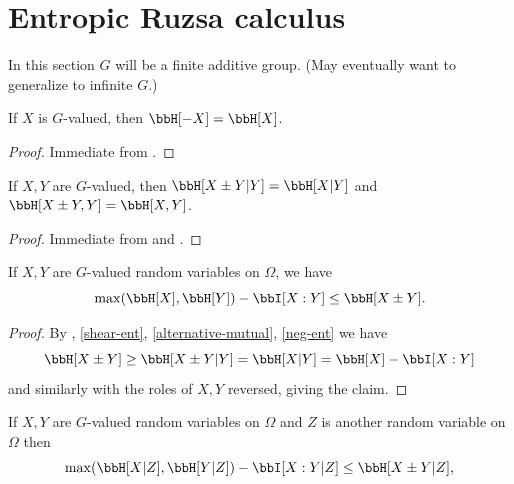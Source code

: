 \chapter{Entropic Ruzsa calculus}

In this section $G$ will be a finite additive group.  (May eventually want to generalize to infinite $G$.)

\begin{lemma}\label{neg-ent}
  \leanok
  If $X$ is $G$-valued, then $\bbH[-X]=\bbH[X]$.
\end{lemma}

\begin{proof}
  \leanok Immediate from .
\end{proof}

\begin{lemma}\label{shear-ent}
  \leanok
  If $X,Y$ are $G$-valued, then $\bbH[X \pm Y | Y]=\bbH[X|Y]$ and $\bbH[X \pm Y, Y] = \bbH[X, Y]$.
\end{lemma}

\begin{proof}
  \leanok Immediate from  and .
\end{proof}

\begin{lemma}\label{sumset-lower-gen}
  \leanok
  If $X,Y$ are $G$-valued random variables on $\Omega$, we have
$$ \max(\bbH[X], \bbH[Y]) -  \bbI[X:Y] \leq \bbH[X \pm Y].$$
\end{lemma}

\begin{proof} \leanok
    By , \ref{shear-ent}, \ref{alternative-mutual}, \ref{neg-ent} we have
$$
 \bbH[X\pm Y] \geq \bbH[X\pm Y|Y] = \bbH[X|Y]= \bbH[X] -  \bbI[X:Y]
$$
and similarly with the roles of $X,Y$ reversed, giving the claim.
\end{proof}

\begin{corollary}\label{sumset-lower-gen-cond}
  \leanok
  If $X,Y$ are $G$-valued random variables on $\Omega$ and $Z$ is another random variable on $\Omega$ then
\[
  \max(\bbH[X|Z], \bbH[Y|Z]) -  \bbI[X:Y|Z] \leq \bbH[X\pm Y|Z],
\]
\end{corollary}

